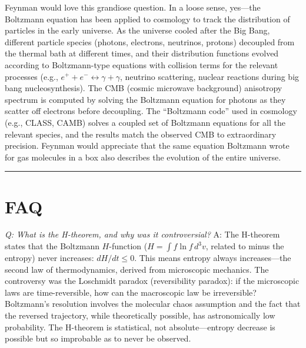 \documentclass[11pt,openright]{book}
\begin{document}
Feynman would love this grandiose question. In a loose sense, yes---the Boltzmann equation has been applied to cosmology to track the distribution of particles in the early universe. As the universe cooled after the Big Bang, different particle species (photons, electrons, neutrinos, protons) decoupled from the thermal bath at different times, and their distribution functions evolved according to Boltzmann-type equations with collision terms for the relevant processes (e.g., $e^+ + e^- \leftrightarrow \gamma + \gamma$, neutrino scattering, nuclear reactions during big bang nucleosynthesis). The CMB (cosmic microwave background) anisotropy spectrum is computed by solving the Boltzmann equation for photons as they scatter off electrons before decoupling. The ``Boltzmann code'' used in cosmology (e.g., CLASS, CAMB) solves a coupled set of Boltzmann equations for all the relevant species, and the results match the observed CMB to extraordinary precision. Feynman would appreciate that the same equation Boltzmann wrote for gas molecules in a box also describes the evolution of the entire universe.

\bigskip
\hrule
\bigskip



\section*{FAQ}

\textit{Q: What is the H-theorem, and why was it controversial?}
A: The H-theorem states that the Boltzmann $H$-function ($H = \int f\ln f\,d^3v$, related to minus the entropy) never increases: $dH/dt \leq 0$. This means entropy always increases---the second law of thermodynamics, derived from microscopic mechanics. The controversy was the Loschmidt paradox (reversibility paradox): if the microscopic laws are time-reversible, how can the macroscopic law be irreversible? Boltzmann's resolution involves the molecular chaos assumption and the fact that the reversed trajectory, while theoretically possible, has astronomically low probability. The H-theorem is statistical, not absolute---entropy decrease is possible but so improbable as to never be observed.
\end{document}
